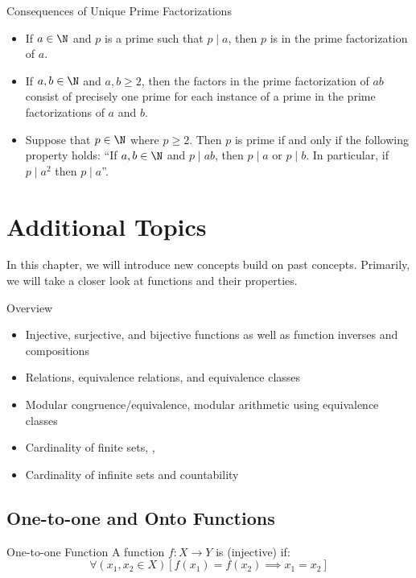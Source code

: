\documentclass[letterpaper,12pt]{report}
\begin{document}
\begin{genbox}{Consequences of Unique Prime Factorizations}
	\begin{itemize}
		\item If $a \in \N$ and $p$ is a prime such that $p \mid a$, then $p$ is in the prime factorization of $a$.
		\item If $a,b \in \N$ and $a,b \geq 2$, then the factors in the prime factorization of $ab$ consist of precisely one prime for each instance of a prime in the prime factorizations of $a$ and $b$.
		\item Suppose that $p \in \N$ where $p \geq 2$. Then $p$ is prime if and only if the following property holds: ``If $a,b \in \N$ and $p \mid ab$, then $p \mid a$ or $p \mid b$. In particular, if $p \mid a^2$ then $p \mid a$''.
	\end{itemize}
\end{genbox}

\chapter{Additional Topics}

In this chapter, we will introduce new concepts build on past concepts. Primarily, we will take a closer look at functions and their properties.

\begin{genbox}{Overview}
	\begin{itemize}
		\item Injective, surjective, and bijective functions as well as function inverses and compositions
		\item Relations, equivalence relations, and equivalence classes
		\item Modular congruence/equivalence, modular arithmetic using equivalence classes
		\item Cardinality of finite sets, , 
		\item Cardinality of infinite sets and countability
	\end{itemize}
\end{genbox}

\section{One-to-one and Onto Functions}

\begin{dfnbox}{One-to-one Function}{}
    A function $f : X \to Y$ is  (injective) if:
    \[ \forall (x_1, x_2 \in X) \left[ f(x_1) = f(x_2) \implies x_1 = x_2 \right] \]
\end{dfnbox}
\end{document}
